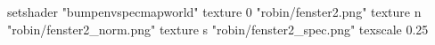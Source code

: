setshader "bumpenvspecmapworld"
   texture 0 "robin/fenster2.png"
   texture n "robin/fenster2_norm.png"
   texture s "robin/fenster2_spec.png"
texscale 0.25